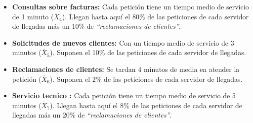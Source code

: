 \begin{itemize}
  \item \textbf{Consultas sobre facturas:} Cada petición tiene un tiempo medio de servicio de 1 minuto ($\overline{X}_{4}$). Llegan hasta aquí el 80\% de las peticiones de cada servidor de llegadas más un 10\% de \emph{``reclamaciones de clientes''}.
  \item \textbf{Solicitudes de nuevos clientes:} Con un tiempo medio de servicio de 3 minutos ($\overline{X}_{5}$). Suponen el 10\% de las peticiones de cada servidor de llegadas.
  \item \textbf{Reclamaciones de clientes:} Se tardan 4 minutos de media en atender la petición ($\overline{X}_{6}$). Suponen el 2\% de las peticiones de cada servidor de llegadas.
  \item \textbf{Servicio tecnico :} Cada petición tiene un tiempo medio de servicio de 5 minutos ($\overline{X}_{7}$). Llegan hasta aquí el 8\% de las peticiones de cada servidor de llegadas más un 20\% de \emph{``reclamaciones de clientes''}.
\end{itemize}
